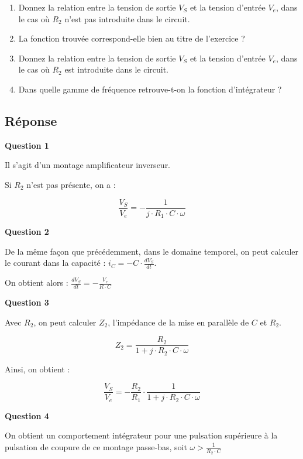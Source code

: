 \begin{enumerate}
	\item Donnez la relation entre la tension de sortie $V_S$ et la tension d'entrée $V_e$, dans le cas où $R_2$ n'est pas introduite dans le circuit.
	\item La fonction trouvée correspond-elle bien au titre de l'exercice ?
	
	\bigskip
	\item Donnez la relation entre la tension de sortie $V_S$ et la tension d'entrée $V_e$, dans le cas où $R_2$ est introduite dans le circuit.
	\item Dans quelle gamme de fréquence retrouve-t-on la fonction d'intégrateur ?
\end{enumerate}


\subsection*{Réponse}

\textbf{Question 1}

Il s'agit d'un montage amplificateur inverseur. 


Si $R_2$ n'est pas présente, on a : 

$$\boxed{ \frac{V_S}{V_e} = - \frac{1}{j \cdot R_1 \cdot C \cdot \omega}}$$

\medskip

\textbf{Question 2}

De la même façon que précédemment, dans le domaine temporel, on peut calculer le courant dans la capacité : $i_C = - C \cdot \frac{d V_S}{dt}$.

On obtient alors : $\frac{d V_S}{dt} = - \frac{V_e}{R \cdot C}$



\medskip

\textbf{Question 3}

Avec $R_2$, on peut calculer $Z_2$, l'impédance de la mise en parallèle de $C$ et $R_2$.

$$Z_2 = \frac{R_2}{1 + j \cdot R_2 \cdot C \cdot \omega}$$

Ainsi, on obtient : 

$$\boxed{ \frac{V_S}{V_e} = - \frac{R_2}{R_1} \cdot \frac{1}{1 + j \cdot R_2 \cdot C \cdot \omega}}$$

\medskip

\textbf{Question 4}

On obtient un comportement intégrateur pour une pulsation supérieure à la pulsation de coupure de ce montage passe-bas, soit $\omega > \frac{1}{R_2 \cdot C}$

